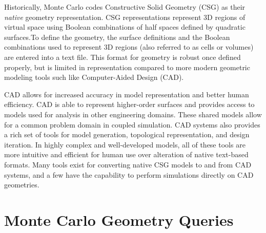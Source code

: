 Historically, Monte Carlo codes Constructive Solid Geometry (CSG) as their
\textit{native} geometry representation. CSG representations represent 3D
regions of virtual space using Boolean combinations of half spaces defined by
quadratic surfaces.To define the geometry, the surface definitions and the
Boolean combinations used to represent 3D regions (also referred to as cells or
volumes) are entered into a text file. This format for geometry is robust once
defined properly, but is limited in representation compared to more modern
geometric modeling tools such like Computer-Aided Design (CAD).

CAD allows for increased accuracy in model representation and better human
efficiency. CAD is able to represent higher-order surfaces and provides access
to models used for analysis in other engineering domains. These shared models
allow for a common problem domain in coupled simulation. CAD systems also provides a
rich set of tools for model generation, topological representation, and design
iteration. In highly complex and well-developed models, all of these tools are
more intuitive and efficient for human use over alteration of native text-based
formats. Many tools exist for converting native CSG models to and from CAD
systems, and a few have the capability to perform simulations directly on CAD
geometries.


\section{Monte Carlo Geometry Queries}

